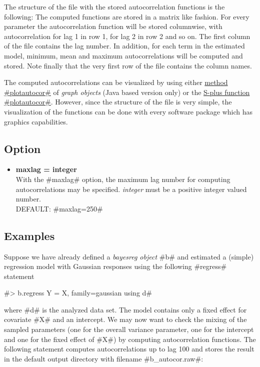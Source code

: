 The structure of the file with the stored autocorrelation
functions is the following: The computed functions are stored in a
matrix like fashion. For every parameter the autocorrelation
function will be stored columnwise, with autocorrelation for lag 1
in row 1, for lag 2 in row 2 and so on. The first column of the
file contains the lag number. In addition, for each term in the
estimated model, minimum, mean and maximum autocorrelations will
be computed and stored. Note finally that the very first row of
the file contains the column names.

The computed autocorrelations can be visualized by using either
\hyperref[graphplotautocor]{method #plotautocor#} of {\em graph
objects} (Java based version only) or the
\hyperref[splusplotautocor]{S-plus function #plotautocor#}.
However, since the structure of the file is very simple, the
visualization of the functions can be done with every software
package which has graphics capabilities.


\subsection{Option}

\begin{itemize}
\item  {\bf maxlag = integer } \\
With the #maxlag# option, the maximum lag number for computing
autocorrelations may be specified.
{\em integer} must be a positive integer valued number. \\
DEFAULT: #maxlag=250#
\end{itemize}



\subsection{Examples}

Suppose we have already defined a {\em bayesreg object} #b# and
estimated a (simple) regression model with Gaussian responses
using the following #regress# statement

#> b.regress Y = X, family=gaussian using d#

where #d# is the analyzed data set. The model contains only a
fixed effect for covariate #X# and an intercept. We may now want
to check the mixing of the sampled parameters (one for the overall
variance parameter, one for the intercept and one for the fixed
effect of #X#) by computing autocorrelation functions. The
following statement computes autocorrelations up to lag 100 and
stores the result in the default output directory with filename
#b_autocor.raw#:

